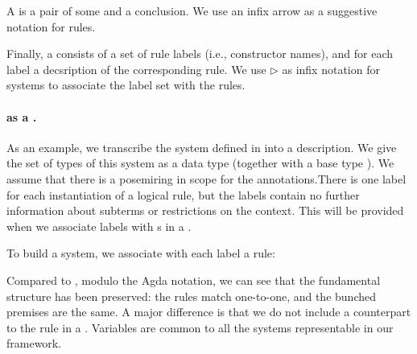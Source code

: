 
A  is a pair of some  and a
conclusion. We use an infix arrow as a suggestive notation for rules.


Finally, a  consists of a set of rule labels (i.e.,
constructor names), and for each label a decsription of the
corresponding rule. We use $\rhd$ as infix notation for systems to
associate the label set with the rules.


\paragraph{ as a .}

As an example, we transcribe the system defined in
 into a description.  We give the set of types of
this system as a data type  (together with a base
type \AgdaInductiveConstructor{$\iota$}). We assume that there is a
posemiring  in scope for the
annotations.There is one label for each instantiation of a logical
rule, but the labels contain no further information about subterms or
restrictions on the context. This will be provided when we associate
labels with s in a .

\noindent
\begin{minipage}[t]{0.5\textwidth}
\end{minipage}
\begin{minipage}[t]{0.5\textwidth}
\end{minipage}

To build a system, we associate with each label a rule:


Compared to , modulo the Agda notation, we can see
that the fundamental structure has been preserved: the rules match
one-to-one, and the bunched premises are the same. A major difference
is that we do not include a counterpart to the
 rule in a
. Variables are common to all the systems
representable in our framework.

